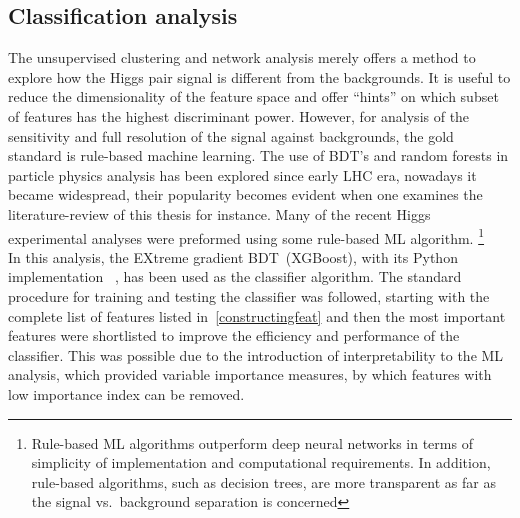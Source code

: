 \subsection{Classification analysis }
The unsupervised clustering and network analysis merely offers a method to explore how the Higgs pair signal is different from the backgrounds. It is useful to reduce the dimensionality of the feature space and offer ``hints'' on which subset of features has the highest discriminant power. However, for analysis of the sensitivity and full resolution of the signal against backgrounds, the gold standard is rule-based machine learning. 
The use of BDT's and random forests in particle physics analysis has been explored since early LHC era,  nowadays it became widespread, their popularity becomes evident when one examines the literature-review of this thesis for instance. Many of the recent Higgs experimental analyses were preformed using some rule-based ML algorithm. \footnote{Rule-based ML algorithms outperform deep neural networks in terms of simplicity of implementation and computational requirements. In addition, rule-based algorithms, such as decision trees, are more transparent as far as the signal vs.~background separation is concerned }\\
In this analysis, the EXtreme gradient BDT~(XGBoost), with its Python implementation ~\cite{10.1145/2939672.2939785}, has been used as the classifier algorithm. The standard procedure for training and testing the classifier was followed, starting with the complete list of features listed in~\autoref{constructingfeat} and then the most important features were shortlisted to improve the efficiency and performance of the classifier. This was possible due to the introduction of interpretability to the ML analysis, which provided variable importance measures, by which features with low importance index can be removed. \\
